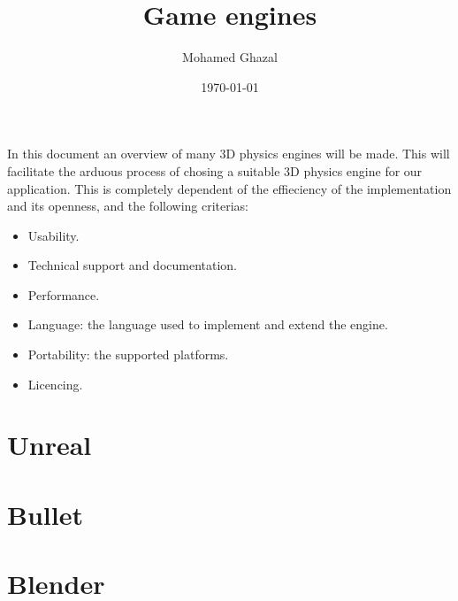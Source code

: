\documentclass[
	12pt, 
	a4paper, 
]{article}
\author{Mohamed Ghazal}
\title{Game engines}
\date{\today}
\begin{document}
	\maketitle
	In this document an overview of many 3D physics engines will be made. This will facilitate the arduous process of chosing a suitable 3D physics engine for our application. This is completely dependent of the effieciency of the implementation and its openness, and the following criterias:
	\begin{itemize}
		\item Usability.
		\item Technical support and documentation.
		\item Performance.
		\item Language: the language used to implement and extend the engine.
		\item Portability: the supported platforms.
		\item Licencing.
	\end{itemize}
	\section{Unreal}
	\section{Bullet}
	\section{Blender}
\end{document}
